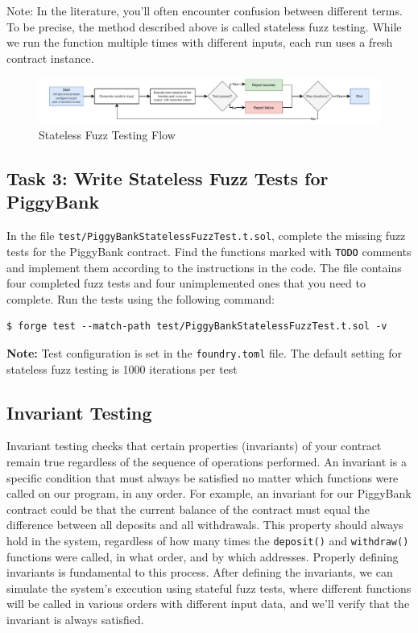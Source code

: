 \documentclass[12pt]{article}
\newcommand{\codegrey}[1]{%
  \texttt{\colorbox{black!4}{\textcolor{black}{#1}}}%
}
\begin{document}
\noindent
Note: In the literature, you'll often encounter confusion between different terms. To be precise, the method described above is called stateless fuzz testing. While we run the function multiple times with different inputs, each run uses a fresh contract instance.

\begin{figure}[h!]
    \centering
    \includegraphics[width=1\textwidth]{fuzz-testing.pdf}
    \caption{Stateless Fuzz Testing Flow}\label{fig:fuzz-testing}
\end{figure}

\subsection*{Task 3: Write Stateless Fuzz Tests for PiggyBank}

In the file \texttt{test/PiggyBankStatelessFuzzTest.t.sol}, complete the
missing fuzz tests for the PiggyBank contract. Find the functions marked with
\codegrey{TODO} comments and implement them according to the instructions in
the code. The file contains four completed fuzz tests and four unimplemented
ones that you need to complete. Run the tests using the following command:

\noindent \begin{minipage}{\textwidth}
    \begin{verbatim}
$ forge test --match-path test/PiggyBankStatelessFuzzTest.t.sol -v
\end{verbatim}
\end{minipage}

\noindent
\textbf{Note:} Test configuration is set in the \texttt{foundry.toml} file. The default setting for stateless fuzz testing is 1000 iterations per test

\subsection{Invariant Testing}

Invariant testing checks that certain properties (invariants) of your contract
remain true regardless of the sequence of operations performed. An invariant is
a specific condition that must always be satisfied no matter which functions
were called on our program, in any order. For example, an invariant for our
PiggyBank contract could be that the current balance of the contract must equal
the difference between all deposits and all withdrawals. This property should
always hold in the system, regardless of how many times the \texttt{deposit()}
and \texttt{withdraw()} functions were called, in what order, and by which
addresses. Properly defining invariants is fundamental to this process. After
defining the invariants, we can simulate the system's execution using stateful
fuzz tests, where different functions will be called in various orders with
different input data, and we'll verify that the invariant is always satisfied.
\end{document}
